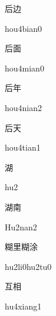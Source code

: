 \begin{verbete}{后边}
\begin{pronuncia}{hou4bian0}
\end{pronuncia}
\end{verbete}

\begin{verbete}{后面}
\begin{pronuncia}{hou4mian0}
\end{pronuncia}
\end{verbete}

\begin{verbete}{后年}
\begin{pronuncia}{hou4nian2}
\end{pronuncia}
\end{verbete}

\begin{verbete}{后天}
\begin{pronuncia}{hou4tian1}
\end{pronuncia}
\end{verbete}

\begin{verbete}[hu2]{湖}
\begin{pronuncia}{hu2}
\end{pronuncia}
\end{verbete}

\begin{verbete}[Hu2nan2]{湖南}
\begin{pronuncia}{Hu2nan2}
\end{pronuncia}
\end{verbete}

\begin{verbete}[hu2li0hu2tu0]{糊里糊涂}
\begin{pronuncia}{hu2li0hu2tu0}
\end{pronuncia}
\end{verbete}

\begin{verbete}[hu4xiang1]{互相}
\begin{pronuncia}{hu4xiang1}
\end{pronuncia}
\end{verbete}

